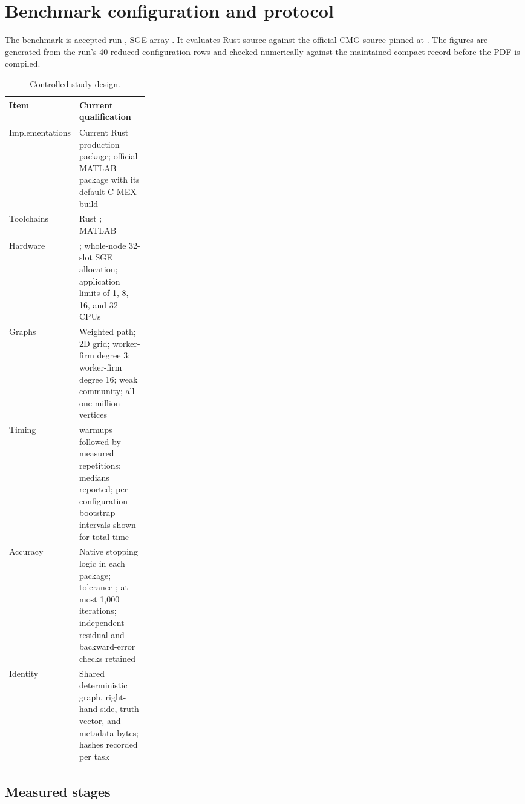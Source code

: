 \documentclass[10pt]{article}
\begin{document}
\section{Benchmark configuration and protocol}

The benchmark is accepted run \texttt{\footnotesize\expandafter\seqsplit\expandafter{\ReportRunId}}, SGE array \ReportJobId.  It evaluates Rust source \texttt{\footnotesize\expandafter\seqsplit\expandafter{\ReportSourceCommit}} against the official CMG source pinned at \texttt{\footnotesize\expandafter\seqsplit\expandafter{\ReportUpstreamCommit}}.  The figures are generated from the run's 40 reduced configuration rows and checked numerically against the maintained compact record before the PDF is compiled.

\clearpage
\begin{table}[!htbp]
\centering
\caption{Controlled study design.}
\label{tab:design}
\begin{tabularx}{\textwidth}{>{\raggedright\arraybackslash}p{0.27\linewidth}>{\raggedright\arraybackslash}X}
\toprule
Item & Current qualification \\
\midrule
Implementations & Current Rust production package; official MATLAB package with its default C MEX build \\
Toolchains & Rust \ReportRustVersion{}; MATLAB \ReportMatlabVersion{} \\
Hardware & \ReportCpuModel{}; whole-node 32-slot SGE allocation; application limits of 1, 8, 16, and 32 CPUs \\
Graphs & Weighted path; 2D grid; worker-firm degree 3; worker-firm degree 16; weak community; all one million vertices \\
Timing & \ReportWarmups{} warmups followed by \ReportRepetitions{} measured repetitions; medians reported; per-configuration bootstrap intervals shown for total time \\
Accuracy & Native stopping logic in each package; tolerance \ReportTolerance{}; at most 1,000 iterations; independent residual and backward-error checks retained \\
Identity & Shared deterministic graph, right-hand side, truth vector, and metadata bytes; hashes recorded per task \\
\bottomrule
\end{tabularx}
\end{table}

\subsection{Measured stages}
\end{document}
